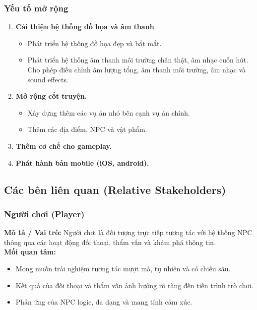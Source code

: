 \subsubsection{Yếu tố mở rộng}
\begin{enumerate}
    \item \textbf{Cải thiện hệ thống đồ họa và âm thanh}.
    \begin{itemize}
        \item Phát triển hệ thống đồ họa đẹp và bắt mắt. 
        
        \item Phát triển hệ thống âm thanh môi trường chân thật, âm nhạc cuốn hút. Cho phép điều chỉnh âm lượng tổng, âm thanh môi trường, âm nhạc và sound effects. 
    \end{itemize}

    \item \textbf{Mở rộng cốt truyện.}
    \begin{itemize}
        \item Xây dựng thêm các vụ án nhỏ bên cạnh vụ án chính.

        \item Thêm các địa điểm, NPC và vật phẩm.
    \end{itemize}

    \item \textbf{Thêm cơ chế cho gameplay.}
    \item \textbf{Phát hành bản mobile (iOS, android).}
\end{enumerate}

\subsection{Các bên liên quan (Relative Stakeholders)}

\subsubsection{Người chơi (Player)}
\textbf{Mô tả / Vai trò:} Người chơi là đối tượng trực tiếp tương tác với hệ thống NPC thông qua các hoạt động đối thoại, thẩm vấn và khám phá thông tin. \\
\textbf{Mối quan tâm:}
\begin{itemize}
    \item Mong muốn trải nghiệm tương tác mượt mà, tự nhiên và có chiều sâu.
    \item Kết quả của đối thoại và thẩm vấn ảnh hưởng rõ ràng đến tiến trình trò chơi.
    \item Phản ứng của NPC logic, đa dạng và mang tính cảm xúc.
\end{itemize}

